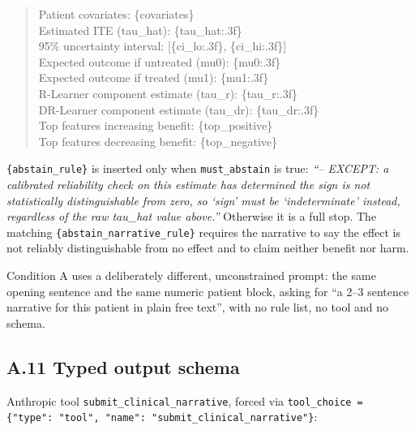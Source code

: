 \begin{quote}
Patient covariates: \{covariates\}\\
Estimated ITE (tau\_hat): \{tau\_hat:.3f\}\\
95\% uncertainty interval: [\{ci\_lo:.3f\}, \{ci\_hi:.3f\}]\\
Expected outcome if untreated (mu0): \{mu0:.3f\}\\
Expected outcome if treated (mu1): \{mu1:.3f\}\\
R-Learner component estimate (tau\_r): \{tau\_r:.3f\}\\
DR-Learner component estimate (tau\_dr): \{tau\_dr:.3f\}\\
Top features increasing benefit: \{top\_positive\}\\
Top features decreasing benefit: \{top\_negative\}
\end{quote}

\texttt{\{abstain\_rule\}} is inserted only when \texttt{must\_abstain} is
true: \emph{``-- EXCEPT: a calibrated reliability check on this estimate has
determined the sign is not statistically distinguishable from zero, so `sign'
must be `indeterminate' instead, regardless of the raw tau\_hat value above.''}
Otherwise it is a full stop. The matching
\texttt{\{abstain\_narrative\_rule\}} requires the narrative to say the effect
is not reliably distinguishable from no effect and to claim neither benefit nor
harm.

Condition A uses a deliberately different, unconstrained prompt: the same
opening sentence and the same numeric patient block, asking for ``a 2--3
sentence narrative for this patient in plain free text'', with no rule list, no
tool and no schema.

\subsection*{A.11 Typed output schema}

Anthropic tool \texttt{submit\_clinical\_narrative}, forced via
\texttt{tool\_choice = \{"type": "tool", "name": "submit\_clinical\_narrative"\}}:

